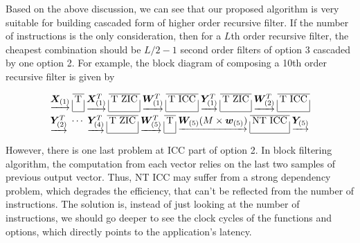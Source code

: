 Based on the above discussion, we can see that our proposed algorithm is very suitable for building cascaded form of higher order recursive filter.
If the number of instructions is the only consideration, then for a $L$th order recursive filter,
the cheapest combination should be $L/2-1$ second order filters of option 3 cascaded by one option 2.
For example, the block diagram of composing a 10th order recursive filter is given by

\begin{equation*}
    \label{eq:4_cascaded_option_3_1_option_2}
    \begin{aligned}
    & \arraycolsep=2.3pt\def\arraystretch{1.0}
    \begin{array}{c|c|c|c|c|c|c|c|c|c|}
        \cline{2-2}
        \cline{4-4}
        \cline{6-6}
        \cline{8-8}
        \cline{10-10}
        \underrightarrow{\bm{X}_{(1)}} & \text{T} & \underrightarrow{\bm{X}_{(1)}^T} & \text{T ZIC} & \underrightarrow{\bm{W}_{(1)}^T} & \text{T ICC} & \underrightarrow{\bm{Y}_{(1)}^T} & \text{T ZIC} & \underrightarrow{\bm{W}_{(2)}^T} & \text{T ICC} \\
        \cline{2-2}
        \cline{4-4}
        \cline{6-6}
        \cline{8-8}
        \cline{10-10}
    \end{array} \\
    & \arraycolsep=2.3pt\def\arraystretch{1.0} 
    \begin{array}{ccc|c|c|c|c|c|c}
        \cline{4-4}
        \cline{6-6}
        \cline{8-8}
        \underrightarrow{\bm{Y}_{(2)}^T} & \cdots & \underrightarrow{\bm{Y}_{(4)}^T} & \text{T ZIC} & \underrightarrow{\bm{W}_{(5)}^T} & \text{T} & \underrightarrow{\bm{W}_{(5)}(M \times \bm{w}_{(5)})} & \text{NT ICC} & \underrightarrow{\bm{Y}_{(5)}} \\
        \cline{4-4}
        \cline{6-6}
        \cline{8-8}
    \end{array} \\
\end{aligned}
\end{equation*}

However, there is one last problem at ICC part of option 2. In block filtering algorithm, the computation from each vector
relies on the last two samples of previous output vector. Thus, 
NT ICC may suffer from a strong dependency problem, which degrades the efficiency,
that can't be reflected from the number of instructions.
The solution is, instead of just looking at the number of instructions,  
we should go deeper to see the clock cycles of the functions and options, which directly points to the 
application's latency.


























